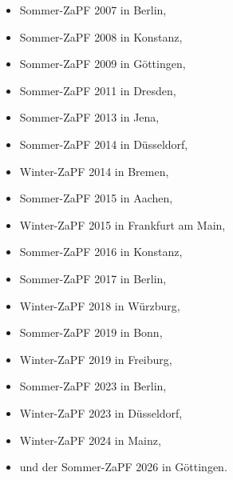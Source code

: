 \documentclass[
  a4paper,
  oneside]{scrartcl}
\providecommand{\tightlist}{%
  \setlength{\itemsep}{0pt}\setlength{\parskip}{0pt}}
\begin{document}
\begin{itemize}
\tightlist
\item
  Sommer-ZaPF 2007 in Berlin,
\item
  Sommer-ZaPF 2008 in Konstanz,
\item
  Sommer-ZaPF 2009 in Göttingen,
\item
  Sommer-ZaPF 2011 in Dresden,
\item
  Sommer-ZaPF 2013 in Jena,
\item
  Sommer-ZaPF 2014 in Düsseldorf,
\item
  Winter-ZaPF 2014 in Bremen,
\item
  Sommer-ZaPF 2015 in Aachen,
\item
  Winter-ZaPF 2015 in Frankfurt am Main,
\item
  Sommer-ZaPF 2016 in Konstanz,
\item
  Sommer-ZaPF 2017 in Berlin,
\item
  Winter-ZaPF 2018 in Würzburg,
\item
  Sommer-ZaPF 2019 in Bonn,
\item
  Winter-ZaPF 2019 in Freiburg,
\item
  Sommer-ZaPF 2023 in Berlin,
\item
  Winter-ZaPF 2023 in Düsseldorf,
\item
  Winter-ZaPF 2024 in Mainz,
\item
  und der Sommer-ZaPF 2026 in Göttingen.
\end{itemize}
\end{document}
